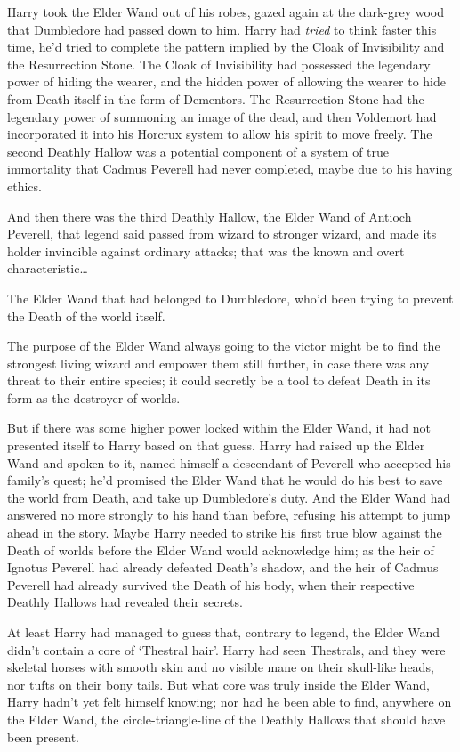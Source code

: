 Harry took the Elder Wand out of his robes, gazed again at the dark-grey wood that Dumbledore had passed down to him. Harry had \emph{tried} to think faster this time, he'd tried to complete the pattern implied by the Cloak of Invisibility and the Resurrection Stone. The Cloak of Invisibility had possessed the legendary power of hiding the wearer, and the hidden power of allowing the wearer to hide from Death itself in the form of Dementors. The Resurrection Stone had the legendary power of summoning an image of the dead, and then Voldemort had incorporated it into his Horcrux system to allow his spirit to move freely. The second Deathly Hallow was a potential component of a system of true immortality that Cadmus Peverell had never completed, maybe due to his having ethics.

And then there was the third Deathly Hallow, the Elder Wand of Antioch Peverell, that legend said passed from wizard to stronger wizard, and made its holder invincible against ordinary attacks; that was the known and overt characteristic{\ldots}

The Elder Wand that had belonged to Dumbledore, who'd been trying to prevent the Death of the world itself.

The purpose of the Elder Wand always going to the victor might be to find the strongest living wizard and empower them still further, in case there was any threat to their entire species; it could secretly be a tool to defeat Death in its form as the destroyer of worlds.

But if there was some higher power locked within the Elder Wand, it had not presented itself to Harry based on that guess. Harry had raised up the Elder Wand and spoken to it, named himself a descendant of Peverell who accepted his family's quest; he'd promised the Elder Wand that he would do his best to save the world from Death, and take up Dumbledore's duty. And the Elder Wand had answered no more strongly to his hand than before, refusing his attempt to jump ahead in the story. Maybe Harry needed to strike his first true blow against the Death of worlds before the Elder Wand would acknowledge him; as the heir of Ignotus Peverell had already defeated Death's shadow, and the heir of Cadmus Peverell had already survived the Death of his body, when their respective Deathly Hallows had revealed their secrets.

At least Harry had managed to guess that, contrary to legend, the Elder Wand didn't contain a core of `Thestral hair'. Harry had seen Thestrals, and they were skeletal horses with smooth skin and no visible mane on their skull-like heads, nor tufts on their bony tails. But what core was truly inside the Elder Wand, Harry hadn't yet felt himself knowing; nor had he been able to find, anywhere on the Elder Wand, the circle-triangle-line of the Deathly Hallows that should have been present.

